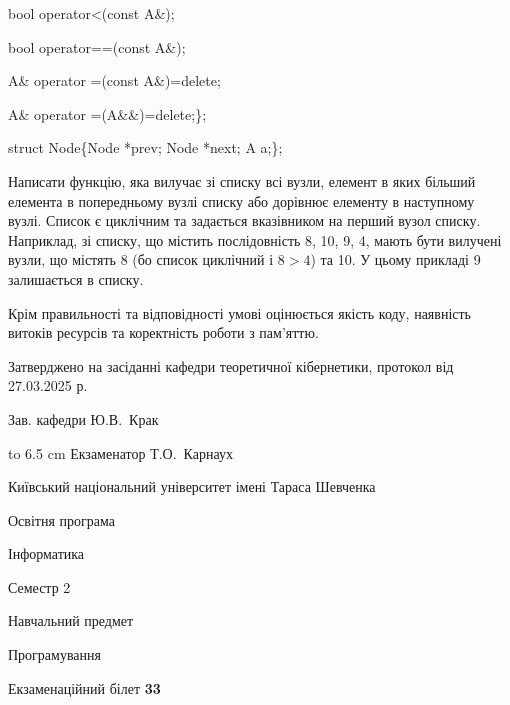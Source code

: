 \documentclass[12pt, ukrainian]{article}
\begin{document}
{\quad  bool operator<(const A\&); 

\quad  bool operator==(const A\&); 

\quad A\& operator =(const A\&)=delete; 

\quad  A\& operator =(A\&\&)=delete;\};

struct Node\{Node *prev; Node *next; A a;\};

Написати функцію, яка вилучає зі списку всі вузли, елемент в яких більший елемента в попередньому вузлі списку або дорівнює елементу в наступному вузлі. Список є циклічним та задається вказівником на перший вузол списку. Наприклад, зі списку, що містить послідовність 8, 10, 9, 4, мають бути вилучені вузли, що містять 8 (бо список циклічний і $8>4$) та 10. У цьому прикладі 9 залишається в списку.

Крім правильності та відповідності умові оцінюється якість коду, наявність витоків ресурсів та коректність роботи з пам'яттю. 

}
{\smallskip\smallskip \begin {scriptsize} Затверджено на засіданні кафедри теоретичної кібернетики, протокол   від   27.03.2025 р.\par\smallskip\smallskip\smallskip\smallskip
{\parbox {6.5 cm} {Зав. кафедри \dotfill Ю.В.~Крак}}\hspace {0.7cm} {\hbox to 6.5 cm { Екзаменатор \dotfill Т.О.~Карнаух}} \end{scriptsize}}
\newpage
{{\begin {scriptsize}\par
{ \center  Київський національний університет імені Тараса Шевченка \par}
{\parbox {5 cm}{Освітня програма \hfill}{\parbox {7 cm}{Інформатика\hfill}}\parbox {6 cm}{\hfill Семестр 2}}\par
{\parbox {5 cm} {Навчальний предмет \hfill}\parbox {7 cm}{Програмування \hfill}\parbox {6cm}{\hfill}\par}\vspace{-15pt} \end{scriptsize}}{\center Екзаменаційний білет \No \textbf { 33 }\par}}
\end{document}
